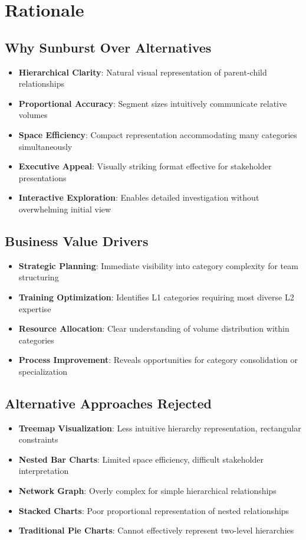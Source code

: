 \documentclass[11pt]{article}
\begin{document}
\section{Rationale}

\subsection{Why Sunburst Over Alternatives}
\begin{itemize}
\item \textbf{Hierarchical Clarity}: Natural visual representation of parent-child relationships
\item \textbf{Proportional Accuracy}: Segment sizes intuitively communicate relative volumes
\item \textbf{Space Efficiency}: Compact representation accommodating many categories simultaneously
\item \textbf{Executive Appeal}: Visually striking format effective for stakeholder presentations
\item \textbf{Interactive Exploration}: Enables detailed investigation without overwhelming initial view
\end{itemize}

\subsection{Business Value Drivers}
\begin{itemize}
\item \textbf{Strategic Planning}: Immediate visibility into category complexity for team structuring
\item \textbf{Training Optimization}: Identifies L1 categories requiring most diverse L2 expertise
\item \textbf{Resource Allocation}: Clear understanding of volume distribution within categories
\item \textbf{Process Improvement}: Reveals opportunities for category consolidation or specialization
\end{itemize}

\subsection{Alternative Approaches Rejected}
\begin{itemize}
\item \textbf{Treemap Visualization}: Less intuitive hierarchy representation, rectangular constraints
\item \textbf{Nested Bar Charts}: Limited space efficiency, difficult stakeholder interpretation
\item \textbf{Network Graph}: Overly complex for simple hierarchical relationships
\item \textbf{Stacked Charts}: Poor proportional representation of nested relationships
\item \textbf{Traditional Pie Charts}: Cannot effectively represent two-level hierarchies
\end{itemize}
\end{document}

